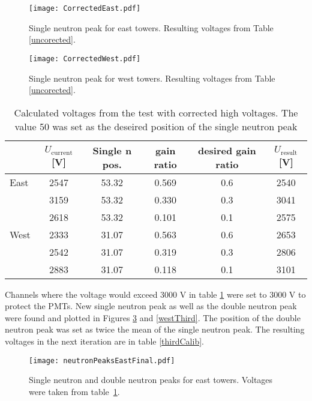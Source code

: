 \documentclass[a4paper,10pt]{report}
\begin{document}
\begin{figure}[htb]
\begin{center}
\texttt{[image: CorrectedEast.pdf]}
\end{center}
\caption{Single neutron peak for east towers. Resulting voltages from Table \ref{uncorected}.}
\label{eastPlot}
\end{figure}

\begin{figure}[htb]
\begin{center}
\texttt{[image: CorrectedWest.pdf]}
\end{center}
\caption{Single neutron peak for west towers. Resulting voltages from Table \ref{uncorected}.}
\label{westPlot}
\end{figure}

\begin{table}[htb] 
\caption{Calculated voltages from the test with corrected high voltages.
The value 50 was set as the deseired position of the single neutron peak}
\label{corected}
\begin{center}
\begin{tabular}{lccccc}
 \toprule
 &$U_\text{current}$[V]&Single n pos.&gain ratio&desired gain ratio&$U_\text{result}$[V]\\
\midrule
 East&2547&53.32&0.569&0.6&2540\\
     &3159&53.32&0.330&0.3&3041\\
     &2618&53.32&0.101&0.1&2575\\
 \midrule
West&2333&31.07&0.563&0.6&2653\\
    &2542&31.07&0.319&0.3&2806\\
    &2883&31.07&0.118&0.1&3101\\
 \bottomrule
\end{tabular}
\end{center}
\end{table}

Channels where the voltage would exceed 3000 V in table \ref{corected} were set to 3000 V to
protect the PMTs. New single neutron peak as well as the double neutron peak were found and
plotted in Figures \ref{eastThird}
and \ref{westThird}. The position of the double neutron peak was set as twice the mean
of the single neutron peak.
The resulting voltages in the next iteration are in table \ref{thirdCalib}.

\begin{figure}[htb]
\begin{center}
\texttt{[image: neutronPeaksEastFinal.pdf]}
\end{center}
\caption{Single neutron and double neutron peaks for east towers.
Voltages were taken from table~\ref{corected}.}
\label{eastThird}
\end{figure}
\end{document}
